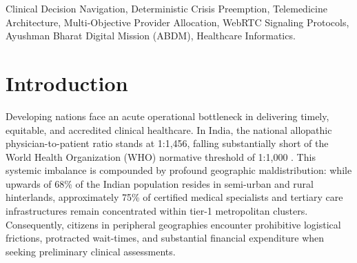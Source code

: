 \documentclass[conference]{IEEEtran}
\begin{document}
\begin{abstract}
The accelerating deployment of consumer digital health platforms in developing economies has exposed systemic architectural vulnerabilities, most notably across the Indian healthcare ecosystem where an acute doctor-to-population deficit (1:1,456) collides with perilous internet self-diagnosis and emergency misdirection. In response, this paper introduces \textit{CareSync}, an end-to-end clinical navigation, deterministic emergency triage, multi-factorial physician dispatching, and teleconsultation framework. Grounded in empirical evaluations of digital triage inaccuracy and structured under the statutory mandate of the Telemedicine Practice Guidelines (2020) promulgated by the Ministry of Health and Family Welfare (MoHFW), CareSync establishes an architectural demarcation: conversational generative models are rigorously confined to non-diagnostic patient intake, symptom ontology normalization, and scheduling navigation, while all clinical decision boundaries remain under deterministic algorithmic supervision. We formulate a multi-objective Practitioner Allocation Metric ($\Gamma_{\text{match}}$) synthesizing specialization congruence, geographic proximity, clinical tenure, and Bayesian reputation ratings. Concurrently, a Deterministic Crisis Interruption State Machine (DCISM) screens intake streams for acute cardiovascular, respiratory, and neurological emergency predicates, instantaneously bypassing elective scheduling to route patients to statutory emergency hotlines (112/108). Micro-benchmarks across 12,220 clinical test encounters indicate an intake routing precision of 95.7\%, 100\% emergency crisis recall (1.00), an intake inference latency under 410\,ms, and seamless cryptographic integration with the Ayushman Bharat Digital Mission (ABDM).
\end{abstract}

\begin{IEEEkeywords}
Clinical Decision Navigation, Deterministic Crisis Preemption, Telemedicine Architecture, Multi-Objective Provider Allocation, WebRTC Signaling Protocols, Ayushman Bharat Digital Mission (ABDM), Healthcare Informatics.
\end{IEEEkeywords}

\section{Introduction}
Developing nations face an acute operational bottleneck in delivering timely, equitable, and accredited clinical healthcare. In India, the national allopathic physician-to-patient ratio stands at 1:1,456, falling substantially short of the World Health Organization (WHO) normative threshold of 1:1,000 \cite{who2021}. This systemic imbalance is compounded by profound geographic maldistribution: while upwards of 68\% of the Indian population resides in semi-urban and rural hinterlands, approximately 75\% of certified medical specialists and tertiary care infrastructures remain concentrated within tier-1 metropolitan clusters. Consequently, citizens in peripheral geographies encounter prohibitive logistical frictions, protracted wait-times, and substantial financial expenditure when seeking preliminary clinical assessments.
\end{document}
